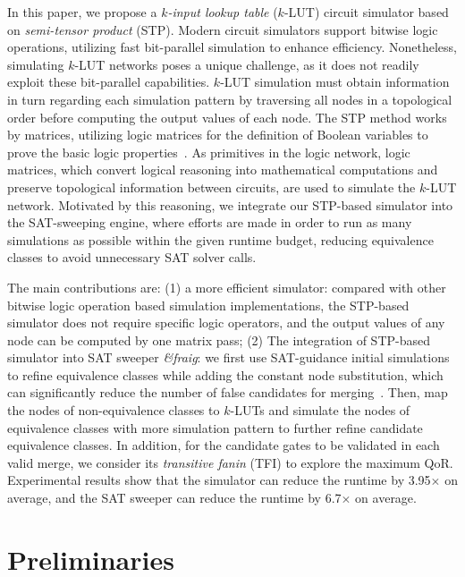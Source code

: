 \documentclass[conference]{IEEEtran}
\begin{document}
In this paper, we propose a \emph{$k$-input lookup table} ($k$-LUT) circuit simulator based on \emph{semi-tensor product} (STP).
Modern circuit simulators support bitwise logic operations, utilizing fast bit-parallel simulation to enhance efficiency. 
Nonetheless, simulating $k$-LUT networks poses a unique challenge, as it does not readily exploit these bit-parallel capabilities. 
$k$-LUT simulation must obtain information in turn regarding each simulation pattern by traversing all nodes in a topological order before computing the output values of each node.
The STP method works by matrices, utilizing logic matrices for the definition of Boolean variables to prove the basic logic properties~\cite{intro6}. 
As primitives in the logic network, logic matrices, which convert logical reasoning into mathematical computations and preserve topological information between circuits, are used to simulate the $k$-LUT network.
Motivated by this reasoning, we integrate our STP-based simulator into the SAT-sweeping engine, where efforts are made in order to run as many simulations as possible within the given runtime budget, reducing equivalence classes to avoid unnecessary SAT solver calls.

The main contributions are: (1) a more efficient simulator: compared with other bitwise logic operation based simulation implementations, the STP-based simulator does not require specific logic operators, and the output values of any node can be computed by one matrix pass; 
(2) The integration of STP-based simulator into SAT sweeper \emph{\&fraig}: we first use SAT-guidance initial simulations to refine equivalence classes while adding the constant node substitution, which can significantly reduce the number of false candidates for merging~\cite{intro7}.
Then, map the nodes of non-equivalence classes to $k$-LUTs and simulate the nodes of equivalence classes with more simulation pattern to further refine candidate equivalence classes.
In addition, for the candidate gates to be validated in each valid merge, we consider its \emph{transitive fanin} (TFI) to explore the maximum QoR.
Experimental results show that the simulator can reduce the runtime by 3.95$\times$ on average, and the SAT sweeper can reduce the runtime by 6.7$\times$ on average.

\vspace{-2mm}
\section{Preliminaries}
\label{sec2}
\end{document}
